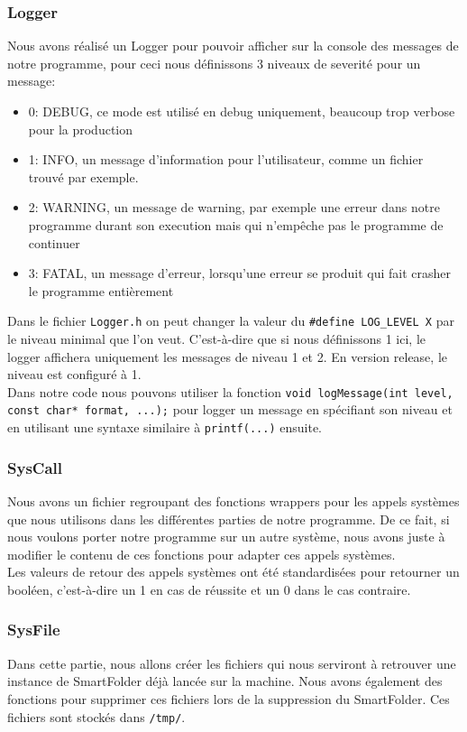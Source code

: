 \documentclass[a4paper]{article}
\begin{document}
\subsubsection{Logger}
Nous avons réalisé un Logger pour pouvoir afficher sur la console des messages de notre programme, pour ceci nous définissons 3 niveaux de severité pour un message:
\begin{itemize}
	\item 0: DEBUG, ce mode est utilisé en debug uniquement, beaucoup trop verbose pour la production
	\item 1: INFO, un message d'information pour l'utilisateur, comme un fichier trouvé par exemple.
	\item 2: WARNING, un message de warning, par exemple une erreur dans notre programme durant son execution mais qui n'empêche pas le programme de continuer
	\item 3: FATAL, un message d'erreur, lorsqu'une erreur se produit qui fait crasher le programme entièrement
\end{itemize}
Dans le fichier \verb+Logger.h+ on peut changer la valeur du \verb+#define LOG_LEVEL X+ par le niveau minimal que l'on veut. C'est-à-dire que si nous définissons 1 ici, le logger affichera uniquement les messages de niveau 1 et 2. En version release, le niveau est configuré à 1.\\

Dans notre code nous pouvons utiliser la fonction \verb+void logMessage(int level, const char* format, ...);+ pour logger un message en spécifiant son niveau et en utilisant une syntaxe similaire à \verb+printf(...)+ ensuite.
\subsubsection{SysCall}
Nous avons un fichier regroupant des fonctions wrappers pour les appels systèmes que nous utilisons dans les différentes parties de notre programme. De ce fait, si nous voulons porter notre programme sur un autre système, nous avons juste à modifier le contenu de ces fonctions pour adapter ces appels systèmes. \\

Les valeurs de retour des appels systèmes ont été standardisées pour retourner un booléen, c'est-à-dire un 1 en cas de réussite et un 0 dans le cas contraire.
\subsubsection{SysFile}
Dans cette partie, nous allons créer les fichiers qui nous serviront à retrouver une instance de SmartFolder déjà lancée sur la machine. Nous avons également des fonctions pour supprimer ces fichiers lors de la suppression du SmartFolder. Ces fichiers sont stockés dans \verb+/tmp/+.\\
\end{document}
